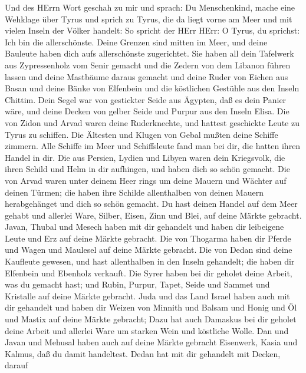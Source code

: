  Und des HErrn Wort geschah zu mir und sprach: 
Du Menschenkind, mache eine Wehklage über Tyrus  und sprich
zu Tyrus, die da liegt vorne am Meer und mit vielen Inseln der Völker
handelt: So spricht der HErr HErr: O Tyrus, du sprichst: Ich bin die
allerschönste.  Deine Grenzen sind mitten im Meer, und deine
Bauleute haben dich aufs allerschönste zugerichtet.  Sie
haben all dein Tafelwerk aus Zypressenholz vom Senir gemacht und die
Zedern von dem Libanon führen lassen und deine Mastbäume daraus gemacht
 und deine Ruder von Eichen aus Basan und deine Bänke von
Elfenbein und die köstlichen Gestühle aus den Inseln Chittim.
 Dein Segel war von gestickter Seide aus Ägypten, daß es
dein Panier wäre, und deine Decken von gelber Seide und Purpur aus den
Inseln Elisa.  Die von Zidon und Arvad waren deine
Ruderknechte, und hattest geschickte Leute zu Tyrus zu schiffen.
 Die Ältesten und Klugen von Gebal mußten deine Schiffe
zimmern. Alle Schiffe im Meer und Schiffsleute fand man bei dir, die
hatten ihren Handel in dir.  Die aus Persien, Lydien und
Libyen waren dein Kriegsvolk, die ihren Schild und Helm in dir
aufhingen, und haben dich so schön gemacht.  Die von Arvad
waren unter deinem Heer rings um deine Mauern und Wächter auf deinen
Türmen; die haben ihre Schilde allenthalben von deinen Mauern
herabgehänget und dich so schön gemacht.  Du hast deinen
Handel auf dem Meer gehabt und allerlei Ware, Silber, Eisen, Zinn und
Blei, auf deine Märkte gebracht.  Javan, Thubal und Mesech
haben mit dir gehandelt und haben dir leibeigene Leute und Erz auf deine
Märkte gebracht.  Die von Thogarma haben dir Pferde und
Wagen und Maulesel auf deine Märkte gebracht.  Die von
Dedan sind deine Kaufleute gewesen, und hast allenthalben in den Inseln
gehandelt; die haben dir Elfenbein und Ebenholz verkauft. 
Die Syrer haben bei dir geholet deine Arbeit, was du gemacht hast; und
Rubin, Purpur, Tapet, Seide und Sammet und Kristalle auf deine Märkte
gebracht.  Juda und das Land Israel haben auch mit dir
gehandelt und haben dir Weizen von Minnith und Balsam und Honig und Öl
und Mastix auf deine Märkte gebracht;  Dazu hat auch
Damaskus bei dir geholet deine Arbeit und allerlei Ware um starken Wein
und köstliche Wolle.  Dan und Javan und Mehusal haben auch
auf deine Märkte gebracht Eisenwerk, Kasia und Kalmus, daß du damit
handeltest.  Dedan hat mit dir gehandelt mit Decken, darauf
